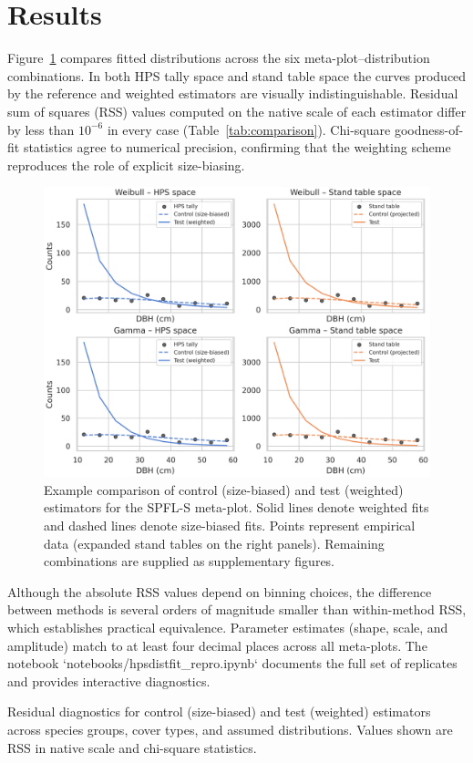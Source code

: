 \section{Results}

Figure~\ref{fig:comparison} compares fitted distributions across the six
meta-plot--distribution combinations. In both HPS tally space and stand table
space the curves produced by the reference and weighted estimators are visually
indistinguishable. Residual sum of squares (RSS) values computed on the native
scale of each estimator differ by less than $10^{-6}$ in every case (Table~\ref{tab:comparison}).
Chi-square goodness-of-fit statistics agree to numerical precision, confirming
that the weighting scheme reproduces the role of explicit size-biasing.

\begin{figure}[htbp]
  \centering
  \includegraphics[width=\textwidth]{../figures/sepm_r_comparison.png}
  \caption{Example comparison of control (size-biased) and test (weighted)
  estimators for the SPFL-S meta-plot. Solid lines denote weighted fits and
  dashed lines denote size-biased fits. Points represent empirical data
  (expanded stand tables on the right panels). Remaining combinations are
  supplied as supplementary figures.}
  \label{fig:comparison}
\end{figure}

Although the absolute RSS values depend on binning choices, the difference
between methods is several orders of magnitude smaller than within-method RSS,
which establishes practical equivalence. Parameter estimates (shape, scale,
and amplitude) match to at least four decimal places across all meta-plots.
The notebook `notebooks/hpsdistfit\_repro.ipynb` documents the full set of
replicates and provides interactive diagnostics.

\begin{table}[htbp]
  \centering
  
  \caption{Residual diagnostics for control (size-biased) and test (weighted)
  estimators across species groups, cover types, and assumed distributions.
  Values shown are RSS in native scale and chi-square statistics.}
  \label{tab:comparison}
\end{table}

